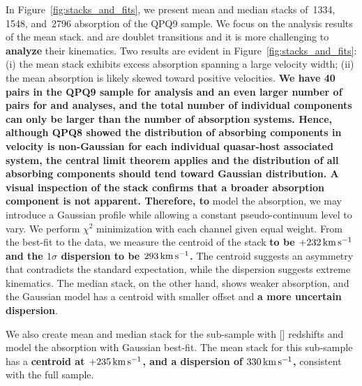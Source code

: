 \documentclass[iop]{emulateapj}
\begin{document}
In Figure~\ref{fig:stacks_and_fits}, we present mean and median stacks of \,1334, 
\,1548, and \,2796 absorption of the QPQ9 sample. We focus on the 
analysis results of the  mean stack.  and  are doublet transitions 
and it is more challenging to {\bf analyze} their kinematics.
Two results are evident in Figure~\ref{fig:stacks_and_fits}: (i) the mean  stack 
exhibits excess absorption spanning a large velocity width; (ii) the mean absorption is likely 
skewed toward positive velocities. {\bf We have 40 pairs in the QPQ9 sample for  analysis
and an even larger number of pairs for  and  analyses, and the total number
of individual components can only be larger than the number of absorption systems. Hence, although
QPQ8 showed the distribution of absorbing components in velocity is non-Gaussian for each
individual quasar-host associated system, the central limit theorem applies and the distribution
of all absorbing components should tend toward Gaussian distribution. A visual inspection of the 
stack confirms that a broader absorption component is not apparent. Therefore, to} model the
absorption, we may introduce a Gaussian profile while allowing a constant pseudo-continuum level 
to vary. We perform $\chi^2$ minimization with each channel given equal weight. From the best-fit 
to the data, we measure the centroid of the  stack {\bf to be \bf $+232\,{\rm km\,s^{-1}}$ and
the $1\sigma$ dispersion to be $293\,{\rm km\,s^{-1}}$.} The centroid suggests an asymmetry that
contradicts the standard expectation, while the dispersion suggests extreme kinematics. The median 
stack, on the other hand, shows weaker absorption, and the Gaussian model has a centroid with 
smaller offset and {\bf a more uncertain dispersion}.

We also create mean and median stack for the sub-sample with [] redshifts and model the 
absorption with Gaussian best-fit. The  mean stack for this sub-sample has a {\bf centroid at
$+235\,{\rm km\,s^{-1}}$, and a dispersion of $330\,{\rm km\,s^{-1}}$,} consistent with the full
sample. 
\end{document}
